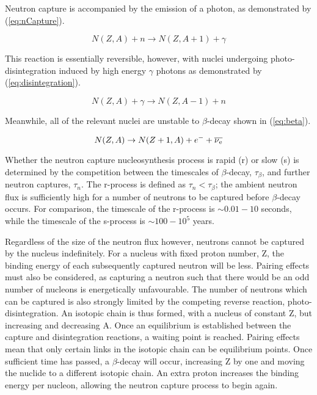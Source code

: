 \documentclass[a4paper,12pt]{article}
\begin{document}
Neutron capture is accompanied by the emission of a photon, as demonstrated by (\ref{eq:nCapture}).

\begin{equation}
\label{eq:nCapture}
N(Z, A) + n \rightarrow N(Z, A+1) + \gamma
\end{equation}

This reaction is essentially reversible, however, with nuclei undergoing photo-disintegration induced by high energy $\gamma$ photons as demonstrated by (\ref{eq:disintegration}).

\begin{equation}
\label{eq:disintegration}
N(Z, A) + \gamma \rightarrow N(Z, A-1) + n 
\end{equation}

Meanwhile, all of the relevant nuclei are unstable to $\beta$-decay shown in (\ref{eq:beta}).

\begin{equation}
\label{eq:beta}
N(Z, A) \rightarrow N(Z+1, A) + e^{-} + \overline{\nu\textsubscript{e}}
\end{equation}

Whether the neutron capture nucleosynthesis process is rapid (r) or slow (s) is determined by the competition between the timescales of $\beta$-decay, $\tau_{\beta}$, and further neutron captures, $\tau_{n}$. The r-process is defined as $\tau_{n}<\tau_{\beta}$; the ambient neutron flux is sufficiently high for a number of neutrons to be captured before $\beta$-decay occurs. For comparison, the timescale of the r-process is $\sim 0.01 - 10$ seconds, while the timescale of the s-process is $\sim 100 - 10^5$ years\cite{b2fh}{}.

Regardless of the size of the neutron flux however, neutrons cannot be captured by the nucleus indefinitely. For a nucleus with fixed proton number, Z, the binding energy of each subsequently captured neutron will be less. Pairing effects must also be considered, as capturing a neutron such that there would be an odd number of nucleons is energetically unfavourable\cite{b2fh}{}. The number of neutrons which can be captured is also strongly limited by the competing reverse reaction, photo-disintegration. An isotopic chain is thus formed, with a nucleus of constant Z, but increasing and decreasing A. Once an equilibrium is established between the capture and disintegration reactions, a waiting point is reached. Pairing effects mean that only certain links in the isotopic chain can be equilibrium points. Once sufficient time has passed, a $\beta$-decay will occur, increasing Z by one and moving the nuclide to a different isotopic chain. An extra proton increases the binding energy per nucleon, allowing the neutron capture process to begin again.
\end{document}
